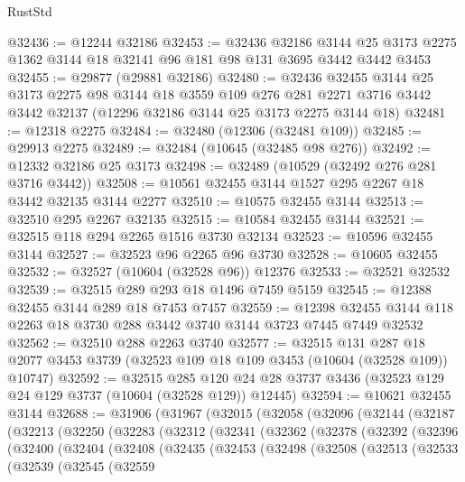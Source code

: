 \begin{lexlean}{RustStd}
\begin{coremodule}
@32436 := @12244 @32186
@32453 := @32436
    @32186
    @3144
    @25
    @3173
    @2275
    @1362
    @3144
    @18
    @32141
    @96
    @181
    @98
    @131
    @3695
    @3442
    @3442
    @3453
@32455 := @29877 (@29881 @32186)
@32480 := @32436
    @32455
    @3144
    @25
    @3173
    @2275
    @98
    @3144
    @18
    @3559
    @109
    @276
    @281
    @2271
    @3716
    @3442
    @3442
    @32137
    (@12296 @32186 @3144 @25 @3173 @2275 @3144 @18)
@32481 := @12318 @2275
@32484 := @32480 (@12306 (@32481 @109))
@32485 := @29913 @2275
@32489 := @32484 (@10645 (@32485 @98 @276))
@32492 := @12332 @32186 @25 @3173
@32498 := @32489 (@10529 (@32492 @276 @281 @3716 @3442))
@32508 := @10561 @32455 @3144 @1527 @295 @2267 @18 @3442 @32135 @3144 @2277
@32510 := @10575 @32455 @3144
@32513 := @32510 @295 @2267 @32135
@32515 := @10584 @32455 @3144
@32521 := @32515 @118 @294 @2265 @1516 @3730 @32134
@32523 := @10596 @32455 @3144
@32527 := @32523 @96 @2265 @96 @3730
@32528 := @10605 @32455
@32532 := @32527 (@10604 (@32528 @96)) @12376
@32533 := @32521 @32532
@32539 := @32515 @289 @293 @18 @1496 @7459 @5159
@32545 := @12388 @32455 @3144 @289 @18 @7453 @7457
@32559 := @12398 @32455 @3144 @118 @2263 @18 @3730 @288 @3442 @3740 @3144 @3723 @7445 @7449 @32532
@32562 := @32510 @288 @2263 @3740
@32577 := @32515
    @131
    @287
    @18
    @2077
    @3453
    @3739
    (@32523 @109 @18 @109 @3453 (@10604 (@32528 @109)) @10747)
@32592 := @32515
    @285
    @120
    @24
    @28
    @3737
    @3436
    (@32523 @129 @24 @129 @3737 (@10604 (@32528 @129)) @12445)
@32594 := @10621 @32455 @3144
@32688 := @31906
    (@31967
      (@32015
        (@32058
          (@32096
            (@32144
              (@32187
                (@32213
                  (@32250
                    (@32283
                      (@32312
                        (@32341
                          (@32362
                            (@32378
                              (@32392
                                (@32396
                                  (@32400
                                    (@32404
                                      (@32408
                                        (@32435
                                          (@32453
                                            (@32498
                                              (@32508
                                                (@32513
                                                  (@32533
                                                    (@32539
                                                      (@32545
                                                        (@32559

\end{coremodule}
\end{lexlean}
